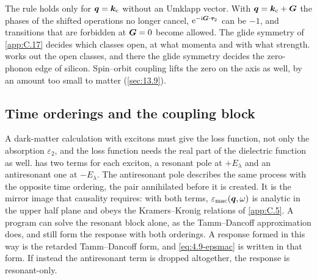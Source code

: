 The rule holds only for $\bm{q} = \bm{k}_{\mathrm{c}}$ without an Umklapp vector. With $\bm{q} = \bm{k}_{\mathrm{c}} + \bm{G}$ the phases of the shifted operations no longer cancel, $\mathrm{e}^{-\mathrm{i}\bm{G}\cdot\bm{\tau}_2}$ can be $-1$, and transitions that are forbidden at $\bm{G} = 0$ become allowed. The glide symmetry of \cref{app:C.17} decides which classes open, at what momenta and with what strength.  works out the open classes, and there the glide symmetry decides the zero-phonon edge of silicon. Spin--orbit coupling lifts the zero on the axis as well, by an amount too small to matter (\cref{sec:13.9}).

\subsection{Time orderings and the coupling block}\label{sec:10.5-orderings}

A dark-matter calculation with excitons must give the loss function, not only the absorption $\varepsilon_2$, and the loss function needs the real part of the dielectric function as well.  has two terms for each exciton, a resonant pole at $+E_\lambda$ and an antiresonant one at $-E_\lambda$. The antiresonant pole describes the same process with the opposite time ordering, the pair annihilated before it is created. It is the mirror image that causality requires: with both terms, $\varepsilon_{\mathrm{mac}}(\bm{q},\omega)$ is analytic in the upper half plane and obeys the Kramers--Kronig relations of \cref{app:C.5}. A program can solve the resonant block alone, as the Tamm--Dancoff approximation does, and still form the response with both orderings. A response formed in this way is the retarded Tamm--Dancoff form, and \cref{eq:4.9-epsmac} is written in that form. If instead the antiresonant term is dropped altogether, the response is resonant-only.

